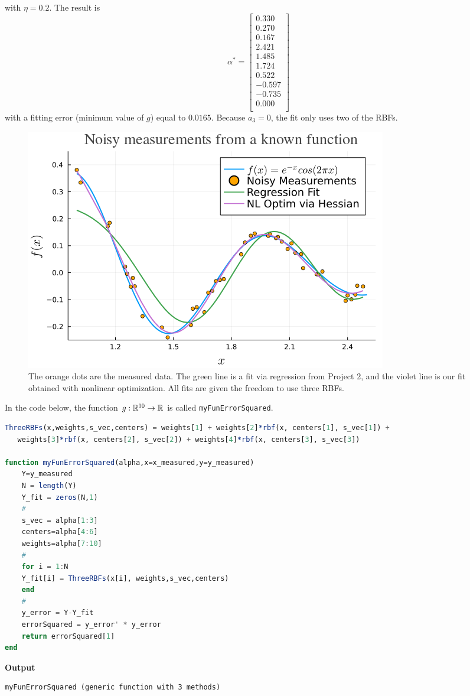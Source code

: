with $\eta=0.2$. The result is 
\begin{equation}
\alpha^\ast = \left[
\begin{array}{r}
0.330 \\
0.270 \\
0.167 \\
2.421 \\
1.485 \\
1.724 \\
0.522 \\
-0.597 \\
-0.735 \\
0.000 \\
\end{array}
\right]
\end{equation}
with a fitting error (minimum value of $g$) equal to $0.0165$. Because $a_3=0$, the fit only uses two of the RBFs. 
\begin{figure}[hbt]%
    \centering
\includegraphics[trim=0 0 0 30,clip,height=0.4\textwidth]{graphics/Chap12Optim/OptimizationViaHessian.png}
\caption[]{The orange dots are the measured data. The green line is a fit via regression from Project 2, and the violet line is our fit obtained with nonlinear optimization. All fits are given the freedom to use three RBFs.
}
\label{fig:Project2_b}%
\end{figure}

\Qed

\begin{remark}
    In the code below, the function $g:\mathbb R^{10} \to \mathbb R$ is called \texttt{myFunErrorSquared}.
\end{remark}

\begin{lstlisting}[language=Julia,style=mystyle]
ThreeRBFs(x,weights,s_vec,centers) = weights[1] + weights[2]*rbf(x, centers[1], s_vec[1]) + 
   weights[3]*rbf(x, centers[2], s_vec[2]) + weights[4]*rbf(x, centers[3], s_vec[3])

function myFunErrorSquared(alpha,x=x_measured,y=y_measured)
    Y=y_measured
    N = length(Y)
    Y_fit = zeros(N,1)
    #
    s_vec = alpha[1:3]
    centers=alpha[4:6]
    weights=alpha[7:10]
    # 
    for i = 1:N
    Y_fit[i] = ThreeRBFs(x[i], weights,s_vec,centers)
    end
    #
    y_error = Y-Y_fit
    errorSquared = y_error' * y_error
    return errorSquared[1]
end
\end{lstlisting}
\textbf{Output} 
\begin{verbatim}
myFunErrorSquared (generic function with 3 methods)
\end{verbatim}

